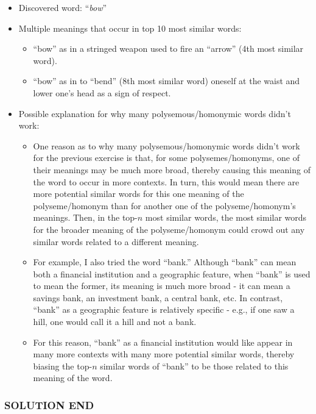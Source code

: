 \documentclass[11pt]{article}
\begin{document}
\begin{itemize}
\item
  Discovered word: ``\emph{bow}''
\item
  Multiple meanings that occur in top 10 most similar words:

  \begin{itemize}
  \item
    ``bow'' as in a stringed weapon used to fire an ``arrow'' (4th most
    similar word).
  \item
    ``bow'' as in to ``bend'' (8th most similar word) oneself at the
    waist and lower one's head as a sign of respect.
  \end{itemize}
\item
  Possible explanation for why many polysemous/homonymic words didn't
  work:

  \begin{itemize}
  \item
    One reason as to why many polysemous/homonymic words didn't work for
    the previous exercise is that, for some polysemes/homonyms, one of
    their meanings may be much more broad, thereby causing this meaning
    of the word to occur in more contexts. In turn, this would mean
    there are more potential similar words for this one meaning of the
    polyseme/homonym than for another one of the polyseme/homonym's
    meanings. Then, in the top-\(n\) most similar words, the most
    similar words for the broader meaning of the polyseme/homonym could
    crowd out any similar words related to a different meaning.
  \item
    For example, I also tried the word ``bank.'' Although ``bank'' can
    mean both a financial institution and a geographic feature, when
    ``bank'' is used to mean the former, its meaning is much more broad
    - it can mean a savings bank, an investment bank, a central bank,
    etc. In contrast, ``bank'' as a geographic feature is relatively
    specific - e.g., if one saw a hill, one would call it a hill and not
    a bank.
  \item
    For this reason, ``bank'' as a financial institution would like
    appear in many more contexts with many more potential similar words,
    thereby biasing the top-\(n\) similar words of ``bank'' to be those
    related to this meaning of the word.
  \end{itemize}
\end{itemize}

\hypertarget{solution-end}{%
\subsubsection{SOLUTION END}\label{solution-end}}
\end{document}
